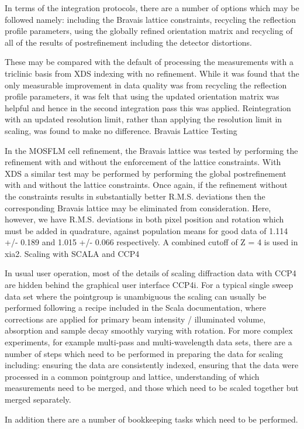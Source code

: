 In terms of the integration protocols, there are a number of options which may be followed namely:
including the Bravais lattice constraints,
recycling the reflection profile parameters,
using the globally refined orientation matrix and
recycling of all of the results of postrefinement including the detector distortions.


These may be compared with the default of processing the measurements with a triclinic basis from XDS indexing with no refinement. While it was found that the only measurable improvement in data quality was from recycling the reflection profile parameters, it was felt that using the updated orientation matrix was helpful and hence in the second integration pass this was applied. Reintegration with an updated resolution limit, rather than applying the resolution limit in scaling, was found to make no difference.
Bravais Lattice Testing

In the MOSFLM cell refinement, the Bravais lattice was tested by performing the refinement with and without the enforcement of the lattice constraints. With XDS a similar test may be performed by performing the global postrefinement with and without the lattice constraints. Once again, if the refinement without the constraints results in substantially better R.M.S. deviations then the corresponding Bravais lattice may be eliminated from consideration. Here, however, we have R.M.S. deviations in both pixel position and rotation which must be added in quadrature, against population means for good data of 1.114 +/- 0.189 and 1.015 +/- 0.066 respectively. A combined cutoff of Z = 4 is used in xia2.
Scaling with SCALA and CCP4

In usual user operation, most of the details of scaling diffraction data with CCP4 are hidden behind the graphical user interface CCP4i. For a typical single sweep data set where the pointgroup is unambiguous the scaling can usually be performed following a recipe included in the Scala documentation, where corrections are applied for primary beam intensity / illuminated volume, absorption and sample decay smoothly varying with rotation. For more complex experiments, for example multi-pass and multi-wavelength data sets, there are a number of steps which need to be performed in preparing the data for scaling including:
ensuring the data are consistently indexed,
ensuring that the data were processed in a common pointgroup and lattice,
understanding of which measurements need to be merged, and those which need to be scaled together but merged separately.


In addition there are a number of bookkeeping tasks which need to be performed. 
